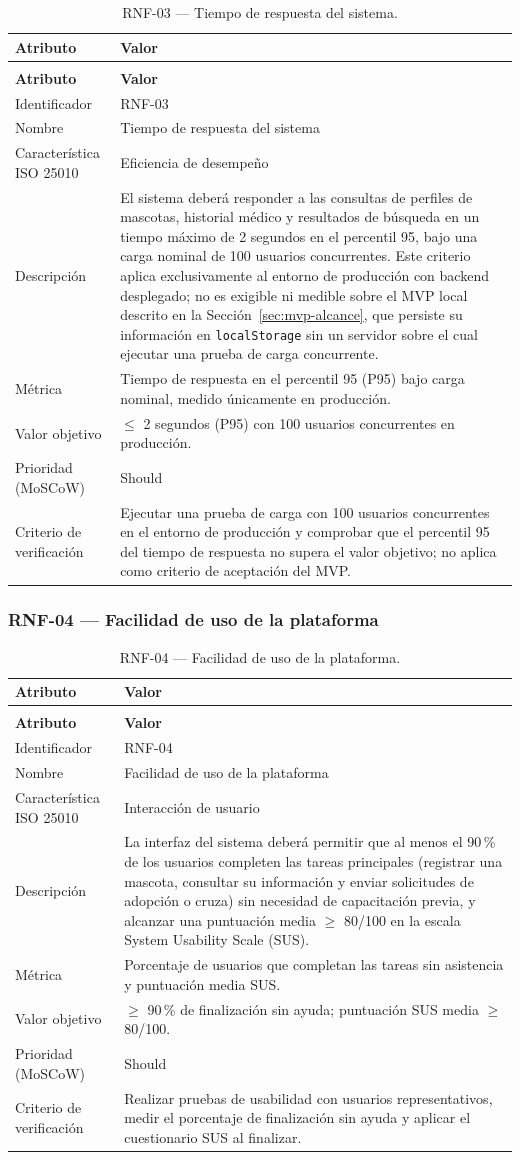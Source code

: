 \documentclass[journal,onecolumn]{IEEEtran}
\makeatletter
\newenvironment{atributos}[2]{%
	\small
	\begin{longtable}{@{}>{\raggedright\arraybackslash}p{4.2cm} >{\raggedright\arraybackslash}p{11.2cm}@{}}
		\caption{#2}\label{tab:#1}\\
		\toprule
		\textbf{Atributo} & \textbf{Valor} \\
		\midrule
		\endfirsthead
		\multicolumn{2}{@{}l}{\small\itshape (continuación)}\\
		\toprule
		\textbf{Atributo} & \textbf{Valor} \\
		\midrule
		\endhead
		\bottomrule
		\endlastfoot
	}{%
	\end{longtable}
	\normalsize
}
\makeatother
\begin{document}
	\begin{atributos}{RNF-03}{RNF-03 --- Tiempo de respuesta del sistema.}
		Identificador & RNF-03 \\
		Nombre & Tiempo de respuesta del sistema \\
		Característica ISO 25010 & Eficiencia de desempeño \\
		Descripción & El sistema deberá responder a las consultas de perfiles de mascotas, historial médico y resultados de búsqueda en un tiempo máximo de 2 segundos en el percentil 95, bajo una carga nominal de 100 usuarios concurrentes. Este criterio aplica exclusivamente al entorno de producción con backend desplegado; no es exigible ni medible sobre el MVP local descrito en la Sección~\ref{sec:mvp-alcance}, que persiste su información en \texttt{localStorage} sin un servidor sobre el cual ejecutar una prueba de carga concurrente. \\
		Métrica & Tiempo de respuesta en el percentil 95 (P95) bajo carga nominal, medido únicamente en producción. \\
		Valor objetivo & $\leq$ 2 segundos (P95) con 100 usuarios concurrentes en producción. \\
		Prioridad (MoSCoW) & Should \\
		Criterio de verificación & Ejecutar una prueba de carga con 100 usuarios concurrentes en el entorno de producción y comprobar que el percentil 95 del tiempo de respuesta no supera el valor objetivo; no aplica como criterio de aceptación del MVP. \\
	\end{atributos}
	
	
	\subsubsection{RNF-04 --- Facilidad de uso de la plataforma}
	
	\begin{atributos}{RNF-04}{RNF-04 --- Facilidad de uso de la plataforma.}
		Identificador & RNF-04 \\
		Nombre & Facilidad de uso de la plataforma \\
		Característica ISO 25010 & Interacción de usuario \\
		Descripción & La interfaz del sistema deberá permitir que al menos el 90\,\% de los usuarios completen las tareas principales (registrar una mascota, consultar su información y enviar solicitudes de adopción o cruza) sin necesidad de capacitación previa, y alcanzar una puntuación media $\geq$ 80/100 en la escala System Usability Scale (SUS). \\
		Métrica & Porcentaje de usuarios que completan las tareas sin asistencia y puntuación media SUS. \\
		Valor objetivo & $\geq$ 90\,\% de finalización sin ayuda; puntuación SUS media $\geq$ 80/100. \\
		Prioridad (MoSCoW) & Should \\
		Criterio de verificación & Realizar pruebas de usabilidad con usuarios representativos, medir el porcentaje de finalización sin ayuda y aplicar el cuestionario SUS al finalizar. \\
	\end{atributos}
	
\end{document}

